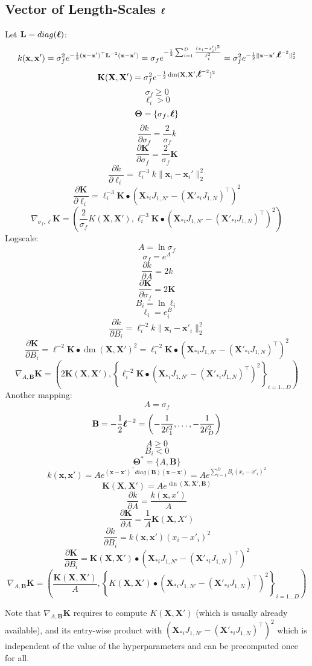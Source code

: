 \documentclass[a4paper,11pt]{article}
\newcommand\x{{\mathbf x}}
\newcommand\X{{\mathbf X}}
\newcommand\K{{\mathbf K}}
\newcommand\LL{{\mathbf L}}
\newcommand\ELL{{\Ivec \ell}}
\DeclareMathOperator*{\dm}{dm}
\newcommand{\Ivec}[1]{\mbox{\boldmath $#1$}}
\begin{document}
\subsection{Vector of Length-Scales $\ELL$}
Let $\mathbf{L} = diag(\ELL)$:
$$k(\x,\x') = \sigma_f^2 e^{-\frac{1}{2}(\x-\x')^{\top} \LL^{-2}
  (\x-\x')} = \sigma_f e^{-\frac{1}{2}\sum_{i=1}^D \frac{(x_i -
    x'_i)^2}{\ell_i^2}} = \sigma_f^2
e^{-\frac{1}{2}\|\x-\x',\ELL^{-2}\|_2^2}$$
$$\K(\X,\X') = \sigma_f^2 e^{-\frac{1}{2} \dm(\X,\X',\ELL^{-2})^2}$$
$$\sigma_f \ge 0$$
$$\ell_i > 0$$
$$\mathbf{\Theta} = \{ \sigma_f, \ELL\}$$
$$\frac{\partial k}{\partial \sigma_f} = \frac{2}{\sigma_f}k$$
$$\frac{\partial \K}{\partial \sigma_f} = \frac{2}{\sigma_f}\K$$
$$\frac{\partial k}{\partial \ell_i} = \ell_i^{-3} k \|\x_i-\x_i'\|_2^2 $$
$$\frac{\partial \K}{\partial \ell_i} = \ell_i^{-3} \K \bullet (\X_{*i}J_{1,N'}- (\X'_{*i}J_{1,N})^{\top})^2$$
$$\nabla_{\sigma_f,\ell} \K = \left(\frac{2}{\sigma_f}K(\X,\X'), \ell_i^{-3} \K \bullet (\X_{*i}J_{1,N'}- (\X'_{*i}J_{1,N})^{\top})^2 \right)$$
Logscale:
$$A = \ln{\sigma_f}$$
$$\sigma_f = e^A$$
$$\frac{\partial k}{\partial A} = 2k$$
$$\frac{\partial \K}{\partial \sigma_f} = 2\K$$
$$B_i = \ln{\ell_i}$$
$$\ell_i = e^B_i$$
$$\frac{\partial k}{\partial B_i} = \ell_i^{-2} k \|\x_i-\x'_i\|_2^2$$
$$\frac{\partial \K}{\partial B_i} = \ell^{-2} \K \bullet \dm(\X,\X')^2 = \ell_i^{-2} \K \bullet (\X_{*i}J_{1,N'}- (\X'_{*i}J_{1,N})^{\top})^2$$
$$\nabla_{A,\mathbf{B}} \K = \left( 2\K(\X,\X'), \left\{ \ell_i^{-2} \K \bullet (\X_{*i}J_{1,N'}- (\X'_{*i}J_{1,N})^{\top})^2 \right\}_{i=1 \ldots D} \right)$$
Another mapping:
$$A = \sigma_f$$
$$\mathbf{B} = -\frac{1}{2}\ELL^{-2} =
\left(-\frac{1}{2\ell_1^2},\ldots,-\frac{1}{2\ell_D^2} \right)$$
$$A \ge 0$$
$$B_i < 0$$
$$\mathbf{\Theta}^* = \{ A, \mathbf{B}\}$$
$$k(\x,\x') = A e^{(\x-\x')^{\top} diag(\mathbf{B}) (\x-\x')} = A
e^{\sum_{i=1}^D B_i (x_i - x'_i)^2}$$ 
$$\K(\X,\X') = A e^{\dm(\X,\X',\mathbf{B})}$$
$$\frac{\partial k}{\partial A} = \frac{k(\x,x')}{A}$$
$$\frac{\partial \K}{\partial A} = \frac{1}{A}\K(\X,X')$$
$$\frac{\partial k}{\partial B_i} = k(\x,\x') (x_i -x'_i)^2$$
$$\frac{\partial \K}{\partial B_i} = \K(\X,\X') \bullet
(\X_{*i}J_{1,N'}- (\X'_{*i}J_{1,N})^{\top})^2$$
$$\nabla_{A,\mathbf{B}} \K = \left(\frac{\K(\X,\X')}{A}, \left\{ K(\X,\X')
  \bullet (\X_{*i}J_{1,N'}- (\X'_{*i}J_{1,N})^{\top})^2 \right\}_{i=1
  \ldots D} \right)$$

Note that $\nabla_{A,\mathbf{B}} \K$ requires to compute $K(\X,\X')$
(which is usually already available), and its entry-wise product with
$(\X_{*i}J_{1,N'}- (\X'_{*i}J_{1,N})^{\top})^2$ which is independent
of the value of the hyperparameters and can be precomputed once for
all.
\end{document}
